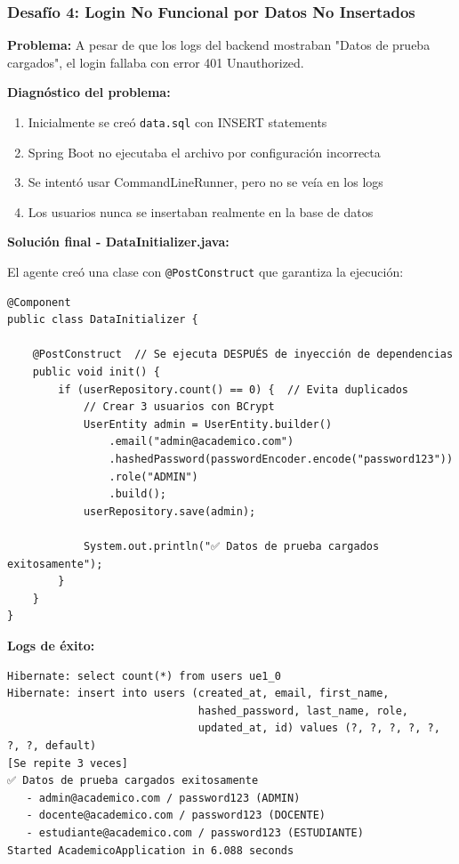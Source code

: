 \documentclass[11pt,a4paper]{article}
\begin{document}
\subsubsection{Desafío 4: Login No Funcional por Datos No Insertados}

\textbf{Problema:} A pesar de que los logs del backend mostraban "Datos de prueba cargados", el login fallaba con error 401 Unauthorized.

\textbf{Diagnóstico del problema:}
\begin{enumerate}
    \item Inicialmente se creó \texttt{data.sql} con INSERT statements
    \item Spring Boot no ejecutaba el archivo por configuración incorrecta
    \item Se intentó usar CommandLineRunner, pero no se veía en los logs
    \item Los usuarios nunca se insertaban realmente en la base de datos
\end{enumerate}

\textbf{Solución final - DataInitializer.java:}

El agente creó una clase con \texttt{@PostConstruct} que garantiza la ejecución:

\begin{verbatim}
@Component
public class DataInitializer {
    
    @PostConstruct  // Se ejecuta DESPUÉS de inyección de dependencias
    public void init() {
        if (userRepository.count() == 0) {  // Evita duplicados
            // Crear 3 usuarios con BCrypt
            UserEntity admin = UserEntity.builder()
                .email("admin@academico.com")
                .hashedPassword(passwordEncoder.encode("password123"))
                .role("ADMIN")
                .build();
            userRepository.save(admin);
            
            System.out.println("✅ Datos de prueba cargados exitosamente");
        }
    }
}
\end{verbatim}

\textbf{Logs de éxito:}
\begin{verbatim}
Hibernate: select count(*) from users ue1_0
Hibernate: insert into users (created_at, email, first_name, 
                              hashed_password, last_name, role, 
                              updated_at, id) values (?, ?, ?, ?, ?, ?, ?, default)
[Se repite 3 veces]
✅ Datos de prueba cargados exitosamente
   - admin@academico.com / password123 (ADMIN)
   - docente@academico.com / password123 (DOCENTE)
   - estudiante@academico.com / password123 (ESTUDIANTE)
Started AcademicoApplication in 6.088 seconds
\end{verbatim}
\end{document}
